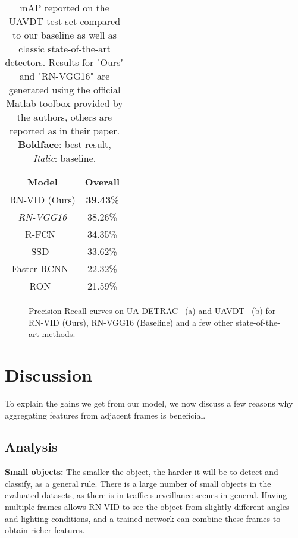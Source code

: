 \documentclass[runningheads]{llncs}
\begin{document}
\begin{table}[t]
\footnotesize
\setlength\tabcolsep{3pt} \def\arraystretch{1.5}
\centering
\caption{mAP reported on the UAVDT test set compared to our baseline as well as classic state-of-the-art detectors. Results for "Ours" and "RN-VGG16" are generated using the official Matlab toolbox provided by the authors, others are reported as in their paper. \textbf{Boldface}: best result, \textit{Italic}: baseline.}
\label{results-UAVDT}
\begin{tabular}{c|c}
Model & Overall \\
\hline
\hline
RN-VID (Ours)& \textbf{39.43}\%\\
\hline
\textit{RN-VGG16}& 38.26\%\\
\hline
R-FCN~\cite{RFCN_NIPS2016_6465} &34.35\%\\
\hline
SSD~\cite{liu2016ssd} & 33.62\%\\
\hline
Faster-RCNN~\cite{ren2015faster} & 22.32\%\\
\hline
RON~\cite{kong2017ron} & 21.59\%\\
\end{tabular}
\vspace{-4mm}
\end{table}

\begin{figure}[t]\centering
    \hspace{2.5em}
    \vspace{-0.5em}
    \caption{Precision-Recall curves on UA-DETRAC~\cite{Wen2015Tracking} (a) and UAVDT~\cite{du2018unmanned} (b) for RN-VID (Ours), RN-VGG16 (Baseline) and a few other state-of-the-art methods.}
\end{figure}

\section{Discussion}
To explain the gains we get from our model, we now discuss a few reasons why aggregating features from adjacent frames is beneficial. 

\subsection{Analysis}
\textbf{Small objects:} The smaller the object, the harder it will be to detect and classify, as a general rule. There is a large number of small objects in the evaluated datasets, as there is in traffic surveillance scenes in general. Having multiple frames allows RN-VID to see the object from slightly different angles and lighting conditions, and a trained network can combine these frames to obtain richer features.
\end{document}
